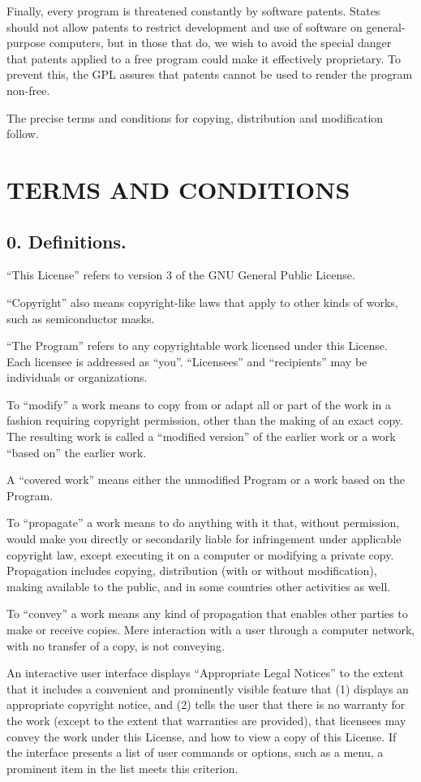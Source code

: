 Finally, every program is threatened constantly by software patents. States should not allow patents to restrict development and use of software on general-purpose computers, but in those that do, we wish to avoid the special danger that patents applied to a free program could make it effectively proprietary. To prevent this, the GPL assures that patents cannot be used to render the program non-free.\par
The precise terms and conditions for copying, distribution and modification follow.
\section{TERMS AND CONDITIONS}
\subsection{0. Definitions.}
“This License” refers to version 3 of the GNU General Public License.\par
“Copyright” also means copyright-like laws that apply to other kinds of works, such as semiconductor masks.\par
“The Program” refers to any copyrightable work licensed under this License. Each licensee is addressed as “you”. “Licensees” and “recipients” may be individuals or organizations.\par
To “modify” a work means to copy from or adapt all or part of the work in a fashion requiring copyright permission, other than the making of an exact copy. The resulting work is called a “modified version” of the earlier work or a work “based on” the earlier work.\par
A “covered work” means either the unmodified Program or a work based on the Program.\par
To “propagate” a work means to do anything with it that, without permission, would make you directly or secondarily liable for infringement under applicable copyright law, except executing it on a computer or modifying a private copy. Propagation includes copying, distribution (with or without modification), making available to the public, and in some countries other activities as well.\par
To “convey” a work means any kind of propagation that enables other parties to make or receive copies. Mere interaction with a user through a computer network, with no transfer of a copy, is not conveying.\par
An interactive user interface displays “Appropriate Legal Notices” to the extent that it includes a convenient and prominently visible feature that (1) displays an appropriate copyright notice, and (2) tells the user that there is no warranty for the work (except to the extent that warranties are provided), that licensees may convey the work under this License, and how to view a copy of this License. If the interface presents a list of user commands or options, such as a menu, a prominent item in the list meets this criterion.
